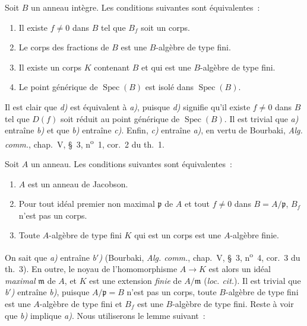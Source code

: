\begin{proposition}[10.4.4]
\label{IV.10.4.4-fr}
Soit $B$ un anneau intègre. Les conditions suivantes sont équivalentes~:
\begin{enumerate}[label=\emph{\alph*)}]
  \item Il existe $f\neq0$ dans $B$ tel que $B_f$ soit un corps.
  \item Le corps des fractions de $B$ est une $B$-algèbre de type fini.
  \item Il existe un corps $K$ contenant $B$ et qui est une $B$-algèbre de
  type fini.
  \item Le point générique de $\operatorname{Spec}(B)$ est isolé dans
  $\operatorname{Spec}(B)$.
\end{enumerate}
\end{proposition}

Il est clair que \emph{d)} est équivalent à \emph{a)}, puisque \emph{d)}
signifie qu'il existe $f\neq0$ dans $B$ tel que $D(f)$ soit réduit au point
générique de $\operatorname{Spec}(B)$. Il est trivial que \emph{a)} entraîne
\emph{b)} et que \emph{b)} entraîne \emph{c)}. Enfin, \emph{c)} entraîne
\emph{a)}, en vertu de Bourbaki, \emph{Alg. comm.}, chap.~V, \S~3,
n\textsuperscript{o}~1, cor.~2 du th.~1.

\begin{proposition}[10.4.5]
\label{IV.10.4.5-fr}
Soit $A$ un anneau. Les conditions suivantes sont équivalentes~:
\begin{enumerate}[label=\emph{\alph*)}]
  \item $A$ est un anneau de Jacobson.
  \item Pour tout idéal premier non maximal $\mathfrak p$ de $A$ et tout
  $f\neq0$ dans $B=A/\mathfrak p$, $B_f$ n'est pas un corps.
  \item[\emph{b$'$)}] Toute $A$-algèbre de type fini $K$ qui est un corps est
  une $A$-algèbre finie.
\end{enumerate}
\end{proposition}

On sait que \emph{a)} entraîne \emph{b$'$)} (Bourbaki,
\emph{Alg. comm.}, chap.~V, \S~3, n\textsuperscript{o}~4, cor.~3 du th.~3).
En outre, le noyau de l'homomorphisme $A\to K$ est alors un idéal
\emph{maximal} $\mathfrak m$ de $A$, et $K$ est une extension \emph{finie} de
$A/\mathfrak m$ (\emph{loc. cit.}). Il est trivial que \emph{b$'$)} entraîne
\emph{b)}, puisque $A/\mathfrak p=B$ n'est pas un corps, toute $B$-algèbre de
type fini est une $A$-algèbre de type fini et $B_f$ est une $B$-algèbre de
type fini. Reste à voir que \emph{b)} implique \emph{a)}. Nous utiliserons le
lemme suivant~:

